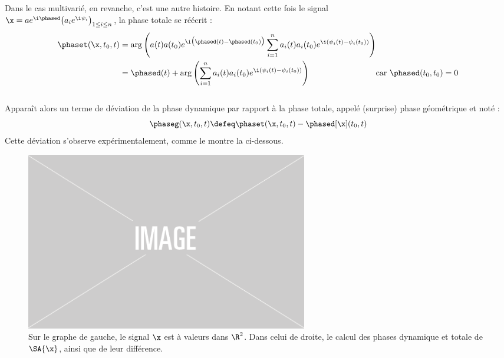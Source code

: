 Dans le cas multivarié, en revanche, c'est une autre histoire. En notant cette fois le signal \\
$\x = ae^{\i \phased} \big( a_ie^{\i \psi_i} \big)_{1\leq i\leq n}$, la phase totale se réécrit :
\begin{equation}\label{eq:diff_phases_t/d}
	\begin{aligned}
		\phaset(\x,t_0, t) &= \arg \left(a(t)a(t_0) e^{\i \big(\phased(t) - \phased(t_0)\big)}\sum_{i=1}^n a_i(t)a_i(t_0)e^{\i (\psi_i(t)-\psi_i(t_0))} \right) \\
		&= \phased(t) + \arg \left(\sum_{i=1}^n a_i(t)a_i(t_0)e^{\i (\psi_i(t)-\psi_i(t_0))} \right)  \qquad\qquad\qquad\qquad \text{car } \phased(t_0,t_0) = 0
	\end{aligned}
\end{equation}
\\
Apparaît alors un terme de déviation de la phase dynamique par rapport à la phase totale, appelé (surprise) phase géométrique et noté :
\begin{equation}\label{eq:phase_g}
	\phaseg(\x,t_0,t) \defeq \phaset(\x, t_0,t) - \phased[\x](t_0,t)
\end{equation}
Cette déviation s'observe expérimentalement, comme le montre la  ci-dessous.
\\
\begin{figure}[h]
	\includegraphics[width=0.6\textwidth]{fig/placeholder}
	\caption[Déviation de la phase dynamique d'un signal bivarié par rapport à sa phase totale]{Sur le graphe de gauche, le signal $\x$ est à valeurs dans $\R^2$. Dans celui de droite, le calcul des phases dynamique et totale de $\SA{\x}$,  ainsi que de leur différence. %
	}
	\label{fig:calc_diff_phases}
\end{figure}
\\

